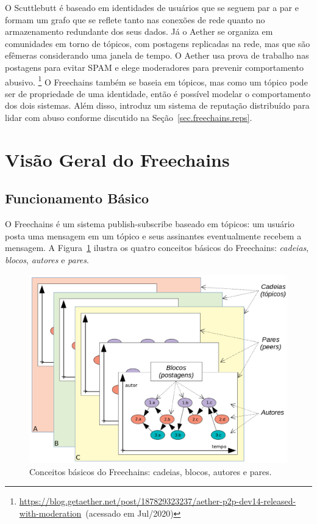 \documentclass[12pt]{article}
\newcommand{\FC} {Freechains\xspace}
\begin{document}
O Scuttlebutt é baseado em identidades de usuários que se seguem par a par e
formam um grafo que se reflete tanto nas conexões de rede quanto no
armazenamento redundante dos seus dados.
Já o Aether se organiza em comunidades em torno de tópicos, com postagens
replicadas na rede, mas que são efêmeras considerando uma janela de tempo.
O Aether usa prova de trabalho nas postagens para evitar SPAM e elege
moderadores para prevenir comportamento abusivo.%
\footnote{{\tiny{\url{https://blog.getaether.net/post/187829323237/aether-p2p-dev14-released-with-moderation}}}~(acessado em Jul/2020)}
%
O \FC também se baseia em tópicos, mas como um tópico pode ser de propriedade
de uma identidade, então é possível modelar o comportamento dos dois sistemas.
Além disso, introduz um sistema de reputação distribuído para lidar com abuso
conforme discutido na Seção~\ref{sec.freechains.reps}.

\section{Visão Geral do \FC}
\label{sec.freechains}

\subsection{Funcionamento Básico}

O \FC é um sistema publish-subscribe baseado em tópicos: um usuário
posta uma mensagem em um tópico e seus assinantes eventualmente recebem a
mensagem.
A Figura~\ref{fig.all} ilustra os quatro conceitos básicos do \FC:
\emph{cadeias}, \emph{blocos}, \emph{autores} e \emph{pares}.

\begin{figure}[ht]
\centering
\includegraphics[width=.60\textwidth]{all3.png}
\caption{\scriptsize{Conceitos básicos do \FC: cadeias, blocos, autores e pares.}}
\label{fig.all}
\end{figure}
\end{document}
